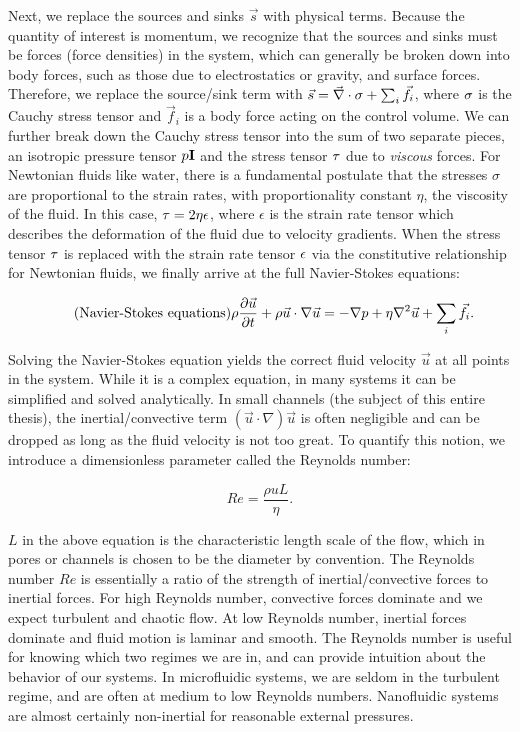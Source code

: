 				Next, we replace the sources and sinks $\vec{s}$ with physical terms. Because the quantity of interest is momentum, we recognize that the sources and sinks must be forces (force densities) in the system, which can generally be broken down into body forces, such as those due to electrostatics or gravity, and surface forces. Therefore, we replace the source/sink term with $\vec{s}=\vec{\nabla}\cdot\mathbf{\sigma}+\sum_{i}\vec{f}_{i}$, where $\mathbf{\sigma}$ is the Cauchy stress tensor and $\vec{f}_{i}$ is a body force acting on the control volume. We can further break down the Cauchy stress tensor into the sum of two separate pieces, an isotropic pressure tensor $p\mathbf{I}$ and the stress tensor $\mathbf{\tau}$ due to \textit{viscous} forces. For Newtonian fluids like water, there is a fundamental postulate that the stresses $\sigma$ are proportional to the strain rates, with proportionality constant $\eta$, the viscosity of the fluid. In this case, $\mathbf{\tau}=2\eta\mathbf{\epsilon}$, where $\epsilon$ is the strain rate tensor which describes the deformation of the fluid due to velocity gradients. When the stress tensor $\mathbf{\tau}$ is replaced with the strain rate tensor $\mathbf{\epsilon}$ via the constitutive relationship for Newtonian fluids, we finally arrive at the full Navier-Stokes equations:
				
				\begin{equation} \label{eq:ns} \tag{Navier-Stokes equations}
					\rho\frac{\partial \vec{u}}{\partial t}+\rho\vec{u}\cdot\mathbf{\nabla}\vec{u}=-\mathbf{\nabla}p+\eta\mathbf{\nabla}^{2}\vec{u}+\sum_{i}\vec{f}_{i}.
				\end{equation}
				
				Solving the Navier-Stokes equation yields the correct fluid velocity $\vec{u}$ at all points in the system. While it is a complex equation, in many systems it can be simplified and solved analytically. In small channels (the subject of this entire thesis), the inertial/convective term $\left(\vec{u}\cdot\nabla\right)\vec{u}$ is often negligible and can be dropped as long as the fluid velocity is not too great. To quantify this notion, we introduce a dimensionless parameter called the Reynolds number:
				
				\begin{equation} \label{eq:reynoldsnum} \tag{Reynolds number}
					Re=\frac{\rho u L}{\eta}.
				\end{equation}
				
				$L$ in the above equation is the characteristic length scale of the flow, which in pores or channels is chosen to be the diameter by convention. The Reynolds number $Re$ is essentially a ratio of the strength of inertial/convective forces to inertial forces. For high Reynolds number, convective forces dominate and we expect turbulent and chaotic flow. At low Reynolds number, inertial forces dominate and fluid motion is laminar and smooth. The Reynolds number is useful for knowing which two regimes we are in, and can provide intuition about the behavior of our systems. In microfluidic systems, we are seldom in the turbulent regime, and are often at medium to low Reynolds numbers. Nanofluidic systems are almost certainly non-inertial for reasonable external pressures.
			

